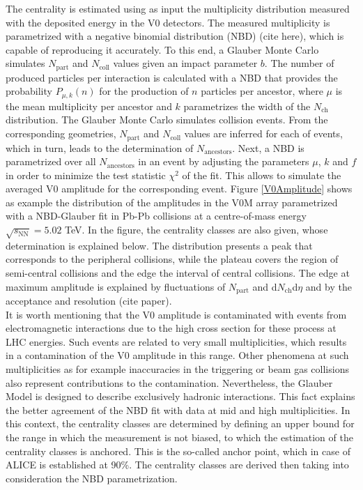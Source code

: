 \documentclass[12pt,a4paper]{report}
\begin{document}
The centrality is estimated using as input the multiplicity distribution measured with the deposited energy in the V0 detectors. The measured multiplicity is parametrized with a negative binomial distribution (NBD) (cite here), which is capable of reproducing it accurately. To this end, a Glauber Monte Carlo simulates $N_\text{part}$ and $N_\text{coll}$ values given an impact parameter $b$. The number of produced particles per interaction is calculated with a NBD that provides the probability $P_{\mu,k}(n)$ for the production of $n$ particles per ancestor, where $\mu$ is the mean multiplicity per ancestor and $k$ parametrizes the width of the $N_\text{ch}$ distribution. The Glauber Monte Carlo simulates collision events. From the corresponding geometries, $N_\text{part}$ and $N_\text{coll}$ values are inferred for each of events, which in turn, leads to the determination of $N_\text{ancestors}$. Next, a NBD is parametrized over all $N_\text{ancestors}$ in an event by adjusting the parameters $\mu$, $k$ and $f$ in order to minimize the test statistic $\chi^2$ of the fit. This allows to simulate the averaged V0 amplitude for the corresponding event. Figure \ref{V0Amplitude} shows as example the distribution of the amplitudes in the V0M array parametrized with a NBD-Glauber fit in Pb-Pb collisions at a centre-of-mass energy $\sqrt{s_\text{NN}}= 5.02$ TeV. In the figure, the centrality classes are also given, whose determination is explained below. The distribution presents a peak that corresponds to the peripheral collisions, while the plateau covers the region of semi-central collisions and the edge the interval of central collisions. The edge at maximum amplitude is explained by fluctuations of $N_\text{part}$ and d$N_\text{ch}$d$\eta$ and by the acceptance and resolution (cite paper).\\
It is worth mentioning that the V0 amplitude is contaminated with events from electromagnetic interactions due to the high cross section for these process at LHC energies. Such events are related to very small multiplicities, which results in a contamination of the V0 amplitude in this range. Other phenomena at such multiplicities as for example inaccuracies in the triggering or beam gas collisions also represent contributions to the contamination. Nevertheless, the Glauber Model is designed to describe exclusively hadronic interactions. This fact explains the better agreement of the NBD fit with data at mid and high multiplicities. In this context, the centrality classes are determined by defining an upper bound for the range in which the measurement is not biased, to which the estimation of the centrality classes is anchored. This is the so-called anchor point, which in case of ALICE is established at 90\%. The centrality classes are derived then taking into consideration the NBD parametrization.
\end{document}
